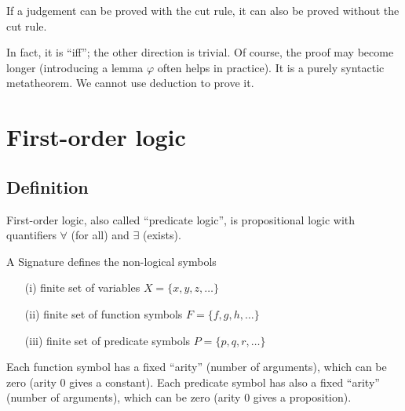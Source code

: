 \begin{theorem}
\label{cl8:thrm:cut}
    If a judgement can be proved with the cut rule, it can also be proved without the cut rule.
\end{theorem}

\begin{remark}
In fact, it is ``iff''; the other direction is trivial.
Of course, the proof may become longer (introducing a lemma $\varphi$ often helps in practice).
It is a purely syntactic metatheorem. We cannot use deduction to prove it.
\end{remark}





\section{First-order logic}


\subsection{Definition}
\begin{remark}
    First-order logic, also called ``predicate logic'', is propositional logic with quantifiers $\forall$ (for all) and $\exists$ (exists).
\end{remark}

\begin{definition}[Signature]
    A Signature defines the non-logical symbols
\begin{itemize}
\item[(i)] finite set of variables $X = \{ x, y, z, \dots \}$
\item[(ii)] finite set of function symbols $F = \{ f, g, h, \dots \}$
\item[(iii)] finite set of predicate symbols $P = \{ p, q, r, \dots \}$
\end{itemize}
Each function symbol has a fixed ``arity'' (number of arguments), which can be zero (arity 0 gives a constant).
Each predicate symbol has also a fixed ``arity'' (number of arguments), which can be zero (arity 0 gives a proposition).
\end{definition}


